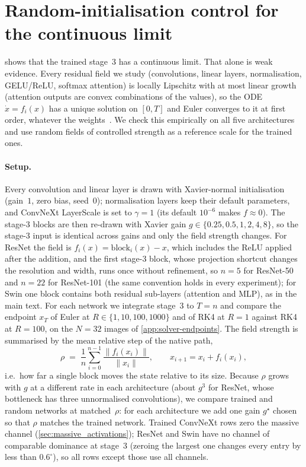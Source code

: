 \section{Random-initialisation control for the continuous limit}
\label{app:random-init}

 shows that the trained stage~3 has a continuous limit.
That alone is weak evidence.
Every residual field we study (convolutions, linear layers, normalisation, GELU/ReLU,
softmax attention) is locally Lipschitz with at most linear growth (attention outputs
are convex combinations of the values), so the ODE $\dot x=f_i(x)$ has a unique solution
on $[0,T]$ and Euler converges to it at first order, whatever the
weights~\citep{hairer1993solving}.
We check this empirically on all five architectures and use random fields of
controlled strength as a reference scale for the trained ones.

\paragraph{Setup.}
Every convolution and linear layer is drawn with Xavier-normal
initialisation~\citep{glorot2010understanding} (gain~$1$, zero bias, seed~$0$);
normalisation layers keep their default parameters, and ConvNeXt LayerScale is set to
$\gamma{=}1$ (its default $10^{-6}$ makes $f\approx0$).
The stage-3 blocks are then re-drawn with Xavier gain $g\in\{0.25,0.5,1,2,4,8\}$, so the
stage-3 input is identical across gains and only the field strength changes.
For ResNet the field is $f_i(x)=\mathrm{block}_i(x)-x$, which includes the ReLU applied
after the addition, and the first stage-3 block, whose projection shortcut changes the
resolution and width, runs once without refinement, so $n{=}5$ for ResNet-50 and
$n{=}22$ for ResNet-101 (the same convention holds in every experiment); for Swin one block contains both residual sub-layers (attention and
MLP), as in the main text.
For each network we integrate stage~3 to $T{=}n$ and compare the endpoint $x_T$ of Euler
at $R\in\{1,10,100,1000\}$ and of RK4 at $R{=}1$ against RK4 at $R{=}100$, on the $N{=}32$
images of \cref{app:solver-endpoints}.
The field strength is summarised by the mean relative step of the native path,
\begin{equation}
    \rho \;=\; \frac{1}{n}\sum_{i=0}^{n-1}\frac{\|f_i(x_i)\|}{\|x_i\|},
    \qquad x_{i+1}=x_i+f_i(x_i),
    \label{eq:step-ratio}
\end{equation}
i.e.\ how far a single block moves the state relative to its size.
Because $\rho$ grows with $g$ at a different rate in each architecture (about $g^3$ for
ResNet, whose bottleneck has three unnormalised convolutions), we compare trained and random networks at
matched~$\rho$: for each architecture we add one gain $g^\star$ chosen so that $\rho$
matches the trained network.
Trained ConvNeXt rows zero the massive channel (\cref{sec:massive_activations});
ResNet and Swin have no channel of comparable dominance at stage~3 (zeroing the largest
one changes every entry by less than $0.6^\circ$), so all rows except those use all
channels.

